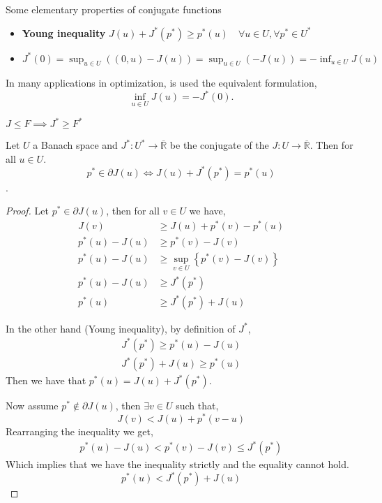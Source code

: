\begin{remark}
Some elementary properties of conjugate functions
\begin{itemize}
	\item  \textbf{Young inequality} $J(u)+J^*(p^*)\geq p^*(u) \quad \forall u \in U, \forall p^* \in U^*$
	\item  $J^*(0)=\sup_{u\in U}\left((0,u)-J(u)\right)=\sup_{u\in U}\left(-J(u)\right)=-\inf_{u\in U}J(u)$
\end{itemize}
In many applications in optimization, is used the equivalent formulation,
\[
\inf_{u\in U}J(u)=-J^*(0).
\]
\end{remark}
$J\leq F \implies J^*\geq F^*$

\begin{theorem}
	Let $U$ a Banach space and $J^*: U^* \rightarrow \overline{\mathbb{R}}$ be the conjugate of the $J:U\rightarrow \overline{\mathbb{R}}$. Then for all $u\in U$. \[p^* \in \partial J(u) \iff J(u)+J^*(p^*)=p^*(u)\]. \label{th7: conjugate plus functional}
	\begin{proof}
		Let $p^* \in \partial J(u)$, then for all $v \in U$ we have,
		\begin{align*}
			J(v)&\geq J(u) +p^*(v)-p^*(u) \\
			p^*(u)-J(u)&\geq p^*(v)-J(v) \\
			p^*(u)-J(u)&\geq \sup_{v\in U} \left\lbrace p^*(v)-J(v)\right\rbrace\\
			p^*(u)-J(u)&\geq J^*(p^*)\\
			p^*(u)&\geq J^*(p^*)+J(u)
		\end{align*}
		
		In the other hand (Young inequality), by definition of $J^*$, 
		\begin{align*}
			J^*(p^*) \geq p^*(u)-J(u)\\
			J^*(p^*)+J(u) \geq p^*(u)
		\end{align*}
		Then we have that $p^*(u)= J(u)+J^*(p^*)$.
		
		Now assume $p^*\notin \partial J(u)$, then $\exists v \in U$ such that,
		\[
			J(v)< J(u)+p^*(v-u)
		\]
		Rearranging the inequality we get,
		\begin{align*}
			p^*(u)-J(u)<p^*(v)-J(v)\leq J^*(p^*)
		\end{align*}
		Which implies that we have the inequality strictly and the equality cannot hold. 
		\[
			p^*(u)<J^*(p^*)+J(u)
		\]
		
	\end{proof}
\end{theorem}
